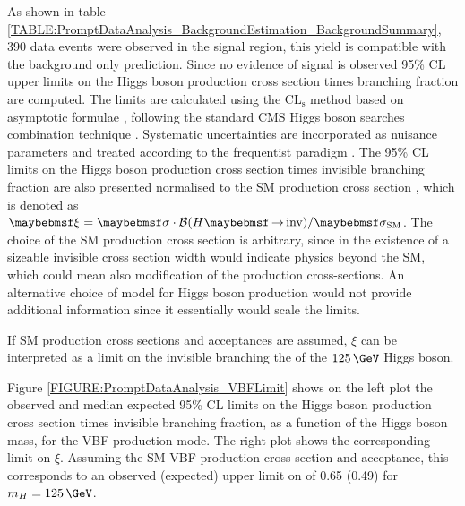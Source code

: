 
As shown in table \ref{TABLE:PromptDataAnalysis_BackgroundEstimation_BackgroundSummary}, 390 data events were observed in the signal region, this yield is compatible with the background only prediction. Since no evidence of signal is observed 95\% \gls{CL} upper limits on the Higgs boson production cross section times branching fraction are computed. The limits are calculated using the $\mathrm{CL}_\mathrm{s}$ method \cite{ARTICLE:HandbookofLHCHiggsCrossSectionsDifferentialDistributions,ARTICLE:CLsTechnique,ARTICLE:CLCompForCombiningSearchesWithSmallStat} based on asymptotic formulae \cite{ARTICLE:AsymptoticCLS}, following the standard \gls{CMS} Higgs boson searches combination technique \cite{ARTICLE:CMS_HiggsDiscovery,ARTICLE:HiggsCombination}. Systematic uncertainties are incorporated as nuisance parameters and treated according to the frequentist paradigm \cite{ARTICLE:HiggsCombination}. The 95\% \gls{CL} limits on the Higgs boson production cross section times invisible branching fraction are also presented normalised to the \gls{SM} production cross section \cite{ARTICLE:HandbookofLHCHiggsCrossSectionsInclusiveObservables,ARTICLE:HandbookofLHCHiggsCrossSectionsDifferentialDistributions}, which is denoted as $\xi = \sigma \cdot \BRinv / \sigma_\mathrm{SM}$. The choice of the \gls{SM} production cross section is arbitrary, since in the existence of a sizeable invisible cross section width would indicate physics beyond the \gls{SM}, which could mean also modification of the production cross-sections. An alternative choice of model for Higgs boson production would not provide additional information since it essentially would scale the limits.

If \gls{SM} production cross sections and acceptances are assumed, $\xi$ can be interpreted as a limit on the invisible branching the  of the $125\,\GeV$ Higgs boson.

Figure \ref{FIGURE:PromptDataAnalysis_VBFLimit} shows on the left plot the observed and median expected 95\% \gls{CL} limits on the Higgs boson production cross section times invisible branching fraction, as a function of the Higgs boson mass, for the \gls{VBF} production mode. The right plot shows the corresponding limit on $\xi$.  Assuming the \gls{SM} \gls{VBF} production cross section and acceptance, this corresponds to an observed (expected) upper limit on \BRinv of 0.65 (0.49) for $m_H=125\,\GeV$.

